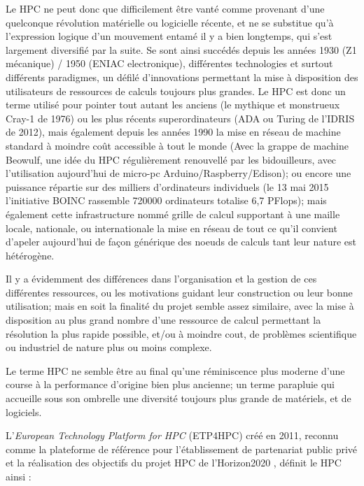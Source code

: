 Le HPC ne peut donc que difficilement être vanté comme provenant d'une quelconque révolution matérielle ou logicielle récente, et ne se substitue qu'à l'expression logique d'un mouvement entamé il y a bien longtemps, qui s'est largement diversifié par la suite. Se sont ainsi succédés depuis les années 1930 (Z1 mécanique) / 1950 (ENIAC electronique), différentes technologies et surtout différents paradigmes, un défilé d'innovations permettant la mise à disposition des utilisateurs de ressources de calculs toujours plus grandes. Le HPC est donc un terme utilisé pour pointer tout autant les anciens (le mythique et monstrueux Cray-1 de 1976) ou les plus récents superordinateurs (ADA ou Turing de l'IDRIS de 2012), mais également depuis les années 1990 la mise en réseau de machine standard à moindre coût accessible à tout le monde (Avec la grappe de machine Beowulf, une idée du HPC régulièrement renouvellé par les bidouilleurs, avec l'utilisation aujourd'hui de micro-pc Arduino/Raspberry/Edison); ou encore une puissance répartie sur des milliers d'ordinateurs individuels (le 13 mai 2015 l'initiative BOINC rassemble 720000 ordinateurs totalise 6,7 PFlops); mais également cette infrastructure nommé grille de calcul supportant à une maille locale, nationale, ou internationale la mise en réseau de tout ce qu'il convient d'apeler aujourd'hui de façon générique des noeuds de calculs tant leur nature est hétérogène.

Il y a évidemment des différences dans l'organisation et la gestion de ces différentes ressources, ou les motivations guidant leur construction ou leur bonne utilisation; mais en soit la finalité du projet semble assez similaire, avec la mise à disposition au plus grand nombre d'une ressource de calcul permettant la résolution la plus rapide possible, et/ou à moindre cout, de problèmes scientifique ou industriel de nature plus ou moins complexe.

Le terme HPC ne semble être au final qu'une réminiscence plus moderne d'une course à la performance d'origine bien plus ancienne; un terme parapluie qui accueille sous son ombrelle une diversité toujours plus grande de matériels, et de logiciels. 

L'\textit{European Technology Platform for HPC} (ETP4HPC) créé en 2011, reconnu comme la plateforme de référence pour l'établissement de partenariat public privé et la réalisation des objectifs du projet HPC de l'Horizon2020 \autocite{ETP4HPC2013}, définit le HPC ainsi : 

